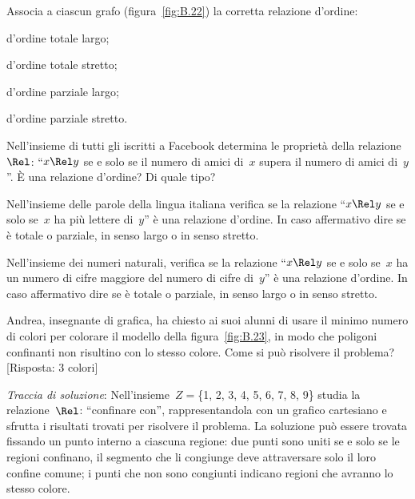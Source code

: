 \begin{multicols}{2}
\begin{esercizio}
\label{ese:B.59}
Associa a ciascun grafo (figura~\ref{fig:B.22}) la corretta relazione d'ordine:
\begin{enumeratea}
\item d'ordine totale largo;
\item d'ordine totale stretto;
\item d'ordine parziale largo;
\item d'ordine parziale stretto.
\end{enumeratea}
\end{esercizio}

\begin{esercizio}
\label{ese:B.60}
Nell'insieme di tutti gli iscritti a Facebook determina le proprietà della 
relazione~$\Rel$: ``$x \Rel y$ se e solo se il numero di amici di~$x$ supera
il numero di amici di~$y$''. È una relazione d'ordine? Di quale tipo?
\end{esercizio}

\begin{esercizio}
\label{ese:B.61}
Nell'insieme delle parole della lingua italiana verifica se la relazione 
``$x \Rel y$ se e solo se~$x$ ha più lettere di~$y$'' è una relazione d'ordine.
In caso affermativo dire se è totale o parziale, in senso largo o in senso 
stretto.
\end{esercizio}

\begin{esercizio}
\label{ese:B.62}
Nell'insieme dei numeri naturali, verifica se la relazione ``$x \Rel y$ se e 
solo se~$x$ ha un numero di cifre maggiore del numero di cifre di~$y$''
è una relazione d'ordine. In caso affermativo dire se è totale o parziale, 
in senso largo o in senso stretto.
\end{esercizio}

\begin{esercizio}
\label{ese:B.63}
Andrea, insegnante di grafica, ha chiesto ai suoi alunni di usare il minimo 
numero di colori per colorare il modello della figura~\ref{fig:B.23},
in modo che poligoni confinanti non risultino con lo stesso colore. 
Come si può risolvere il problema? [Risposta: 3 colori]

\emph{Traccia di soluzione}: Nell'insieme~$Z =$\{1, 2, 3, 4, 5, 6, 7, 8, 9\} 
studia la relazione~$\Rel$: ``confinare con'', rappresentandola con un grafico 
cartesiano e sfrutta i risultati trovati per risolvere il problema.
La soluzione può essere trovata fissando un punto interno a ciascuna regione: 
due punti sono uniti se e solo se le regioni confinano, il segmento che li 
congiunge deve attraversare solo il loro confine comune; 
i punti che non sono congiunti indicano regioni che avranno lo stesso colore.
\end{esercizio}
\end{multicols}

